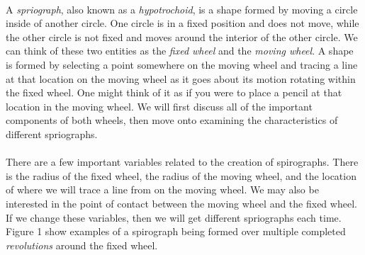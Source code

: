 \documentclass{article}
\begin{document}
\paragraph{}
A \textit{spriograph}, also known as a \textit{hypotrochoid}, is a shape formed by moving a circle inside of another circle. One circle is in a fixed position and does not move, while the other circle is not fixed and moves around the interior of the other circle. We can think of these two entities as the \textit{fixed wheel} and the \textit{moving wheel}. A shape is formed by selecting a point somewhere on the moving wheel and tracing a line at that location on the moving wheel as it goes about its motion rotating within the fixed wheel. One might think of it as if you were to place a pencil at that location in the moving wheel. We will first discuss all of the important components of both wheels, then move onto examining the characteristics of different spriographs.

\paragraph{}
There are a few important variables related to the creation of spirographs. There is the radius of the fixed wheel, the radius of the moving wheel, and the location of where we will trace a line from on the moving wheel. We may also be interested in the point of contact between the moving wheel and the fixed wheel. If we change these variables, then we will get different spriographs each time. Figure 1 show examples of a spirograph being formed over multiple completed \textit{revolutions} around the fixed wheel.



\end{document}

